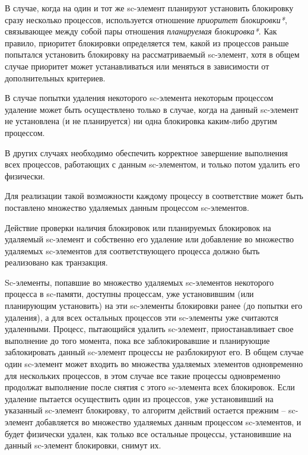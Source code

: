 \begin{SCn}
\end{SCn}

В случае, когда на один и тот же sc-элемент планируют установить блокировку сразу несколько процессов, используется отношение \textit{приоритет блокировки*}, связывающее между собой пары отношения \textit{планируемая блокировка*}. Как правило, приоритет блокировки определяется тем, какой из процессов раньше попытался установить блокировку на рассматриваемый sc-элемент, хотя в общем случае приоритет может устанавливаться или меняться в зависимости от дополнительных критериев.

В случае попытки удаления некоторого sc-элемента некоторым процессом удаление может быть осуществлено только в случае, когда на данный sc-элемент не установлена (и не планируется) ни одна блокировка каким-либо другим процессом.
	
В других случаях необходимо обеспечить корректное завершение выполнения всех процессов, работающих с данным sc-элементом, и только потом удалить его физически.
	
Для реализации такой возможности каждому процессу в соответствие может быть поставлено множество удаляемых данным процессом sc-элементов.

Действие проверки наличия блокировок или планируемых блокировок на удаляемый sc-элемент и собственно его удаление или добавление во множество удаляемых sc-элементов для соответствующего процесса должно быть реализовано как транзакция.

\begin{SCn}
\end{SCn}

Sc-элементы, попавшие во множество удаляемых sc-элементов некоторого процесса в sc-памяти, доступны процессам, уже установившим (или планирующим установить) на эти sc-элементы блокировки ранее (до попытки его удаления), а для всех остальных процессов эти sc-элементы уже считаются удаленными. Процесс, пытающийся удалить sc-элемент, приостанавливает свое выполнение до того момента, пока все заблокировавшие и планирующие заблокировать данный sc-элемент процессы не разблокируют его. В общем случае один sc-элемент может входить во множества удаляемых элементов одновременно для нескольких процессов, в этом случае все такие процессы одновременно продолжат выполнение после снятия с этого sc-элемента всех блокировок. Если удаление пытается осуществить один из процессов, уже установивший на указанный sc-элемент блокировку, то алгоритм действий остается прежним -- sc-элемент добавляется во множество удаляемых данным процессом sc-элементов, и будет физически удален, как только все остальные процессы, установившие на данный sc-элемент блокировки, снимут их.

